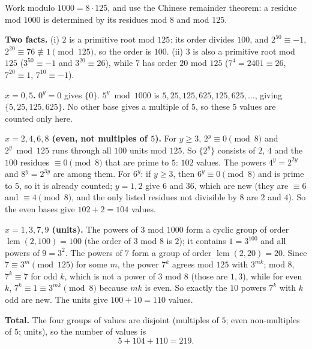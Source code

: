 Work modulo $1000=8\cdot125$, and use the Chinese remainder theorem: a residue mod $1000$ is determined by its residues mod $8$ and mod $125$.

\textbf{Two facts.} (i) $2$ is a primitive root mod $125$: its order divides $100$, and $2^{50}\equiv-1$, $2^{20}\equiv76\not\equiv1\pmod{125}$, so the order is $100$. (ii) $3$ is also a primitive root mod $125$ ($3^{50}\equiv-1$ and $3^{20}\equiv26$), while $7$ has order $20$ mod $125$ ($7^4=2401\equiv26$, $7^{20}\equiv1$, $7^{10}\equiv-1$).

\textbf{$x=0,5$.} $0^y=0$ gives $\{0\}$. $5^y\bmod1000$ is $5,25,125,625,125,625,\dots$, giving $\{5,25,125,625\}$. No other base gives a multiple of $5$, so these $5$ values are counted only here.

\textbf{$x=2,4,6,8$ (even, not multiples of $5$).} For $y\ge3$, $2^y\equiv0\pmod8$ and $2^y \bmod 125$ runs through all $100$ units mod $125$. So $\{2^y\}$ consists of $2$, $4$ and the $100$ residues $\equiv0\pmod8$ that are prime to $5$: $102$ values. The powers $4^y=2^{2y}$ and $8^y=2^{3y}$ are among them. For $6^y$: if $y\ge3$, then $6^y\equiv0\pmod8$ and is prime to $5$, so it is already counted; $y=1,2$ give $6$ and $36$, which are new (they are $\equiv6$ and $\equiv4\pmod8$, and the only listed residues not divisible by $8$ are $2$ and $4$). So the even bases give $102+2=104$ values.

\textbf{$x=1,3,7,9$ (units).} The powers of $3$ mod $1000$ form a cyclic group of order $\operatorname{lcm}(2,100)=100$ (the order of $3$ mod $8$ is $2$); it contains $1=3^{100}$ and all powers of $9=3^2$. The powers of $7$ form a group of order $\operatorname{lcm}(2,20)=20$. Since $7\equiv 3^m\pmod{125}$ for some $m$, the power $7^k$ agrees mod $125$ with $3^{mk}$; mod $8$, $7^k\equiv7$ for odd $k$, which is not a power of $3$ mod $8$ (those are $1,3$), while for even $k$, $7^k\equiv1\equiv3^{mk}\pmod 8$ because $mk$ is even. So exactly the $10$ powers $7^k$ with $k$ odd are new. The units give $100+10=110$ values.

\textbf{Total.} The four groups of values are disjoint (multiples of $5$; even non-multiples of $5$; units), so the number of values is
\[
5+104+110=\boxed{219}.
\]
